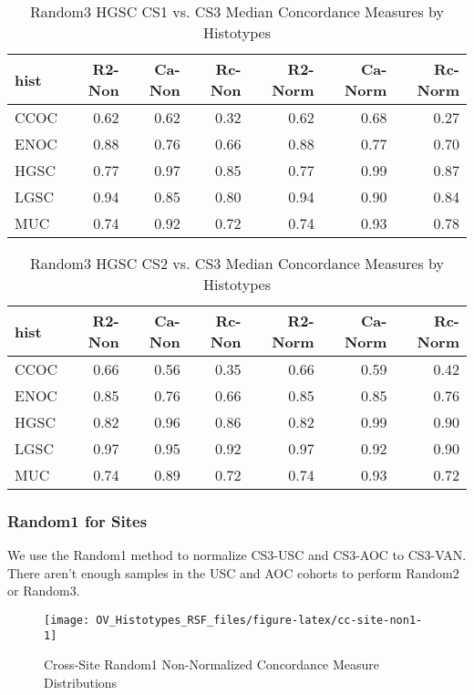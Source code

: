\documentclass[
]{report}
\begin{document}
\begin{table}

\caption{\label{tab:rand3-hgsc-cs1-vs-cs3}Random3 HGSC CS1 vs. CS3 Median Concordance Measures by Histotypes}
\centering
\begin{tabular}[t]{l|r|r|r|r|r|r}
\hline
hist & R2-Non & Ca-Non & Rc-Non & R2-Norm & Ca-Norm & Rc-Norm\\
\hline
CCOC & 0.62 & 0.62 & 0.32 & 0.62 & 0.68 & 0.27\\
\hline
ENOC & 0.88 & 0.76 & 0.66 & 0.88 & 0.77 & 0.70\\
\hline
HGSC & 0.77 & 0.97 & 0.85 & 0.77 & 0.99 & 0.87\\
\hline
LGSC & 0.94 & 0.85 & 0.80 & 0.94 & 0.90 & 0.84\\
\hline
MUC & 0.74 & 0.92 & 0.72 & 0.74 & 0.93 & 0.78\\
\hline
\end{tabular}
\end{table}

\begin{table}

\caption{\label{tab:rand3-hgsc-cs2-vs-cs3}Random3 HGSC CS2 vs. CS3 Median Concordance Measures by Histotypes}
\centering
\begin{tabular}[t]{l|r|r|r|r|r|r}
\hline
hist & R2-Non & Ca-Non & Rc-Non & R2-Norm & Ca-Norm & Rc-Norm\\
\hline
CCOC & 0.66 & 0.56 & 0.35 & 0.66 & 0.59 & 0.42\\
\hline
ENOC & 0.85 & 0.76 & 0.66 & 0.85 & 0.85 & 0.76\\
\hline
HGSC & 0.82 & 0.96 & 0.86 & 0.82 & 0.99 & 0.90\\
\hline
LGSC & 0.97 & 0.95 & 0.92 & 0.97 & 0.92 & 0.90\\
\hline
MUC & 0.74 & 0.89 & 0.72 & 0.74 & 0.93 & 0.72\\
\hline
\end{tabular}
\end{table}

\hypertarget{random1-for-sites}{%
\subsubsection{Random1 for Sites}\label{random1-for-sites}}

We use the Random1 method to normalize CS3-USC and CS3-AOC to CS3-VAN. There aren't enough samples in the USC and AOC cohorts to perform Random2 or Random3.

\begin{figure}[H]

{\centering \texttt{[image: OV\_Histotypes\_RSF\_files/figure-latex/cc-site-non1-1]} 

}

\caption{Cross-Site Random1 Non-Normalized Concordance Measure Distributions}\label{fig:cc-site-non1}
\end{figure}
\end{document}
